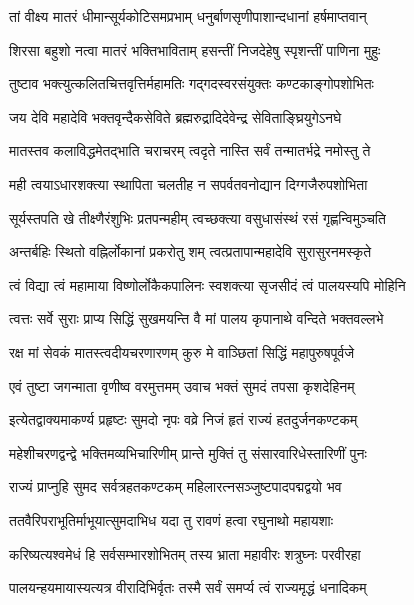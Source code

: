 \twolineshloka
{तां वीक्ष्य मातरं धीमान्सूर्यकोटिसमप्रभाम्}
{धनुर्बाणसृणीपाशान्दधानां हर्षमाप्तवान्}%

\twolineshloka
{शिरसा बहुशो नत्वा मातरं भक्तिभाविताम्}
{हसन्तीं निजदेहेषु स्पृशन्तीं पाणिना मुहुः}%

\twolineshloka
{तुष्टाव भक्त्युत्कलितचित्तवृत्तिर्महामतिः}
{गद्गदस्वरसंयुक्तः कण्टकाङ्गोपशोभितः}%

\twolineshloka
{जय देवि महादेवि भक्तवृन्दैकसेविते}
{ब्रह्मरुद्रादिदेवेन्द्र सेविताङ्घ्रियुगेऽनघे}%

\twolineshloka
{मातस्तव कलाविद्धमेतद्भाति चराचरम्}
{त्वदृते नास्ति सर्वं तन्मातर्भद्रे नमोस्तु ते}%

\twolineshloka
{मही त्वयाऽधारशक्त्या स्थापिता चलतीह न}
{सपर्वतवनोद्यान दिग्गजैरुपशोभिता}%

\twolineshloka
{सूर्यस्तपति खे तीक्ष्णैरंशुभिः प्रतपन्महीम्}
{त्वच्छक्त्या वसुधासंस्थं रसं गृह्णन्विमुञ्चति}%

\twolineshloka
{अन्तर्बहिः स्थितो वह्निर्लोकानां प्रकरोतु शम्}
{त्वत्प्रतापान्महादेवि सुरासुरनमस्कृते}%

\twolineshloka
{त्वं विद्या त्वं महामाया विष्णोर्लोकैकपालिनः}
{स्वशक्त्या सृजसीदं त्वं पालयस्यपि मोहिनि}%

\twolineshloka
{त्वत्तः सर्वे सुराः प्राप्य सिद्धिं सुखमयन्ति वै}
{मां पालय कृपानाथे वन्दिते भक्तवल्लभे}%

\twolineshloka
{रक्ष मां सेवकं मातस्त्वदीयचरणारणम्}
{कुरु मे वाञ्छितां सिद्धिं महापुरुषपूर्वजे}%


\twolineshloka
{एवं तुष्टा जगन्माता वृणीष्व वरमुत्तमम्}
{उवाच भक्तं सुमदं तपसा कृशदेहिनम्}%

\twolineshloka
{इत्येतद्वाक्यमाकर्ण्य प्रहृष्टः सुमदो नृपः}
{वव्रे निजं हृतं राज्यं हतदुर्जनकण्टकम्}%

\twolineshloka
{महेशीचरणद्वन्द्वे भक्तिमव्यभिचारिणीम्}
{प्रान्ते मुक्तिं तु संसारवारिधेस्तारिणीं पुनः}%


\twolineshloka
{राज्यं प्राप्नुहि सुमद सर्वत्रहतकण्टकम्}
{महिलारत्नसञ्जुष्टपादपद्मद्वयो भव}%

\twolineshloka
{ततवैरिपराभूतिर्माभूयात्सुमदाभिध}
{यदा तु रावणं हत्वा रघुनाथो महायशाः}%

\twolineshloka
{करिष्यत्यश्वमेधं हि सर्वसम्भारशोभितम्}
{तस्य भ्राता महावीरः शत्रुघ्नः परवीरहा}%

\twolineshloka
{पालयन्हयमायास्यत्यत्र वीरादिभिर्वृतः}
{तस्मै सर्वं समर्प्य त्वं राज्यमृद्धं धनादिकम्}%

